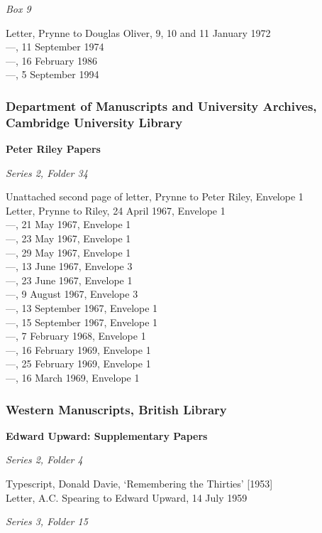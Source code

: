 \documentclass[]{article}
\begin{document}
\emph{Box 9}

Letter, Prynne to Douglas Oliver, 9, 10 and 11 January 1972\\
—, 11 September 1974\\
—, 16 February 1986\\
—, 5 September 1994

\subsubsection{Department of Manuscripts and University Archives,
Cambridge University
Library}\label{department-of-manuscripts-and-university-archives-cambridge-university-library}

\textbf{Peter Riley Papers}

\emph{Series 2, Folder 34}

Unattached second page of letter, Prynne to Peter Riley, Envelope 1\\
Letter, Prynne to Riley, 24 April 1967, Envelope 1\\
—, 21 May 1967, Envelope 1\\
—, 23 May 1967, Envelope 1\\
—, 29 May 1967, Envelope 1\\
—, 13 June 1967, Envelope 3\\
—, 23 June 1967, Envelope 1\\
—, 9 August 1967, Envelope 3\\
—, 13 September 1967, Envelope 1\\
—, 15 September 1967, Envelope 1\\
—, 7 February 1968, Envelope 1\\
—, 16 February 1969, Envelope 1\\
—, 25 February 1969, Envelope 1\\
—, 16 March 1969, Envelope 1

\subsubsection{Western Manuscripts, British
Library}\label{western-manuscripts-british-library}

\textbf{Edward Upward: Supplementary Papers}

\emph{Series 2, Folder 4}

Typescript, Donald Davie, ‘Remembering the Thirties’ {[}1953{]}\\
Letter, A.C. Spearing to Edward Upward, 14 July 1959

\emph{Series 3, Folder 15}
\end{document}
